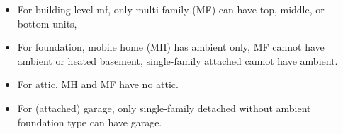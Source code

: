 \begin{itemize}
\item For building level mf, only multi-family (MF) can have top, middle, or bottom units,
\item For foundation, mobile home (MH) has ambient only, MF cannot have ambient or heated basement, single-family attached cannot have ambient.
\item For attic, MH and MF have no attic.
\item For (attached) garage, only single-family detached without ambient foundation type can have garage.
\end{itemize}
